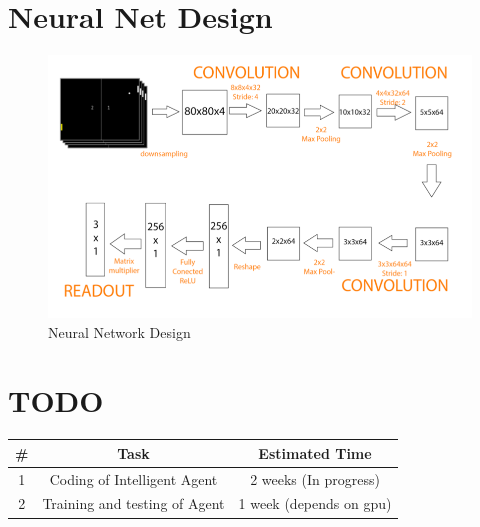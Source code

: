 \documentclass[twoside,letterpaper]{article}
\begin{document}
\newpage
\section{Neural Net Design}
\begin{figure}[ht]
  \centering
  \includegraphics[width=15cm]{images/network}
  \caption{Neural Network Design}
\end{figure}

\newpage
\section{TODO}
\begin{center}
 \begin{tabular}{|c c c|} 
 \hline
 \textbf{\#} & \textbf{Task} & \textbf{Estimated Time} \\ [0.5ex] 
 \hline\hline
 1 & Coding of Intelligent Agent & 2 weeks (In progress)\\ 
 \hline
 2 & Training and testing of Agent & 1 week (depends on gpu) \\
 \hline
\end{tabular}
\end{center}
\end{document}
